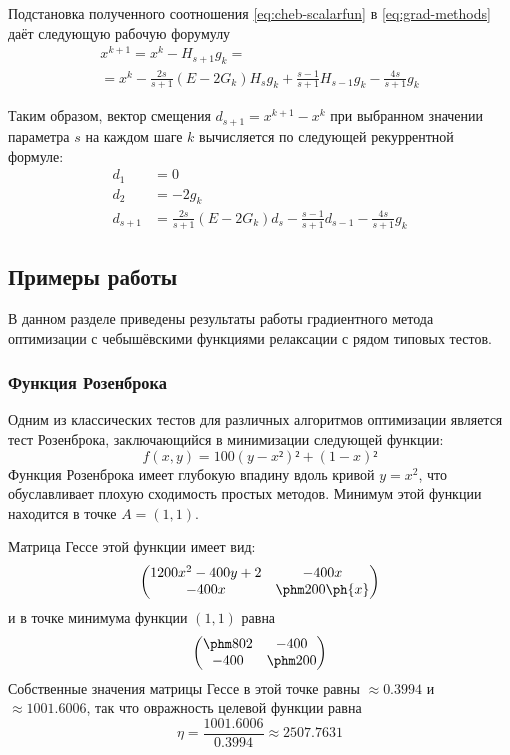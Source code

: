 Подстановка полученного соотношения \eqref{eq:cheb-scalarfun}
в \eqref{eq:grad-methods} даёт следующую рабочую форумулу
\begin{multline}
  x^{k+1} = x^k - H_{s+1}g_k =\\=
  x^k-\frac{2s}{s+1}(E-2G_k)H_sg_k+\frac{s-1}{s+1}H_{s-1}g_k-\frac{4s}{s+1}g_k
\end{multline}

Таким образом, вектор смещения $d_{s+1} = x^{k+1} - x^k$ при выбранном
значении параметра $s$ на каждом шаге $k$ вычисляется по следующей
рекуррентной формуле:
\begin{equation}
  \label{eq:cheb-workhorse}
  \begin{aligned}
    d_1 &= 0\\
    d_2 &= -2g_k \\
    d_{s+1} &=
    \frac{2s}{s+1}(E-2G_k)d_{s}-\frac{s-1}{s+1}d_{s-1}-\frac{4s}{s+1}g_k
  \end{aligned}
\end{equation}


\clearpage
\subsection{Примеры работы}

В данном разделе приведены результаты работы градиентного метода
оптимизации с чебышёвскими функциями релаксации с рядом типовых
тестов.

\subsubsection{Функция Розенброка}

Одним из классических тестов для различных алгоритмов оптимизации
является тест Розенброка, заключающийся в минимизации следующей
функции:
\begin{equation}
  \label{eq:rosenbrock}
  f(x, y) = 100(y - x²)² + (1 - x)²
\end{equation}
Функция Розенброка имеет глубокую впадину вдоль кривой $y=x^2$, что
обуславливает плохую сходимость простых методов. Минимум этой функции
находится в точке $A=(1,1)$.

Матрица Гессе этой функции имеет вид:
\begin{equation*}
  \begin{pmatrix}
    1200x^2-400y+2 & -400x \\
    -400x & \phm200\ph{x}
  \end{pmatrix}
\end{equation*}
и в точке минимума функции $(1, 1)$ равна
\begin{equation*}
  \begin{pmatrix}
    \phm 802 & -400 \\ -400 & \phm 200
  \end{pmatrix}
\end{equation*}
Собственные значения матрицы Гессе в этой точке равны ${\approx}0.3994$ и
${\approx}1001.6006$, так что овражность целевой функции равна
\begin{equation*}
  \eta = \frac{1001.6006}{0.3994} \approx 2507.7631
\end{equation*}

